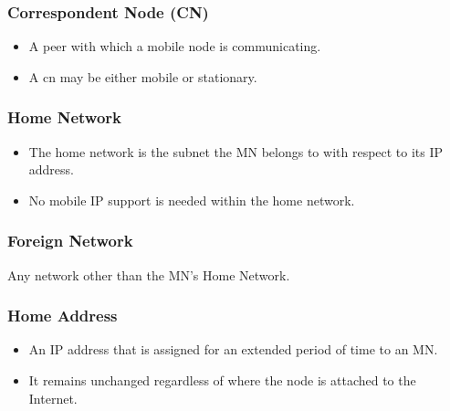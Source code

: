\subsubsection[Correspondent Node]{Correspondent Node (CN)}
\begin{itemize}
	\item A peer with which a mobile node is communicating.  
	\item A \gls{cn} may be either mobile or stationary.
\end{itemize}

\subsubsection{Home Network}
\begin{itemize}
	\item The home network is the subnet the MN belongs to with respect to its IP address. 
	\item No mobile IP support is needed within the home network.
\end{itemize}

\subsubsection{Foreign Network}
Any network other than the MN's Home Network.

\subsubsection{Home Address}
\begin{itemize}
	\item An IP address that is assigned for an extended period of time to an MN.
	\item It remains unchanged regardless of where the node is attached to the Internet.
\end{itemize}

